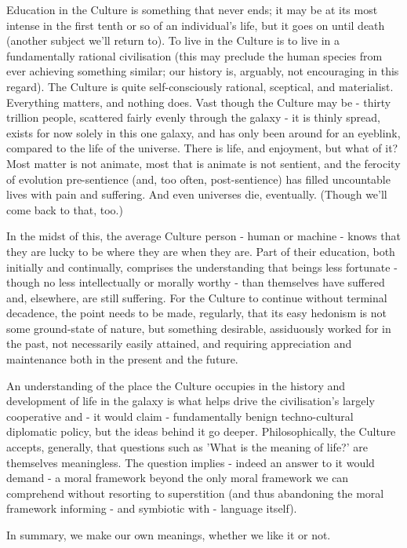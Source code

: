 Education in the Culture is something that never ends; it may be at its most intense in the first tenth or so of an individual's life, but it goes on until death (another subject we'll return to). To live in the Culture is to live in a fundamentally rational civilisation (this may preclude the human species from ever achieving something similar; our history is, arguably, not encouraging in this regard). The Culture is quite self-consciously rational, sceptical, and materialist. Everything matters, and nothing does. Vast though the Culture may be - thirty trillion people, scattered fairly evenly through the galaxy - it is thinly spread, exists for now solely in this one galaxy, and has only been around for an eyeblink, compared to the life of the universe. There is life, and enjoyment, but what of it? Most matter is not animate, most that is animate is not sentient, and the ferocity of evolution pre-sentience (and, too often, post-sentience) has filled uncountable lives with pain and suffering. And even universes die, eventually. (Though we'll come back to that, too.)

In the midst of this, the average Culture person - human or machine - knows that they are lucky to be where they are when they are. Part of their education, both initially and continually, comprises the understanding that beings less fortunate - though no less intellectually or morally worthy - than themselves have suffered and, elsewhere, are still suffering. For the Culture to continue without terminal decadence, the point needs to be made, regularly, that its easy hedonism is not some ground-state of nature, but something desirable, assiduously worked for in the past, not necessarily easily attained, and requiring appreciation and maintenance both in the present and the future.

An understanding of the place the Culture occupies in the history and development of life in the galaxy is what helps drive the civilisation's largely cooperative and - it would claim - fundamentally benign techno-cultural diplomatic policy, but the ideas behind it go deeper. Philosophically, the Culture accepts, generally, that questions such as 'What is the meaning of life?' are themselves meaningless. The question implies - indeed an answer to it would demand - a moral framework beyond the only moral framework we can comprehend without resorting to superstition (and thus abandoning the moral framework informing - and symbiotic with - language itself).

In summary, we make our own meanings, whether we like it or not.

